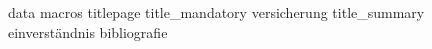 {data}
{macros}
{titlepage}
{title_mandatory}
{versicherung}
{title_summary}
{einverständnis}
{bibliografie}
